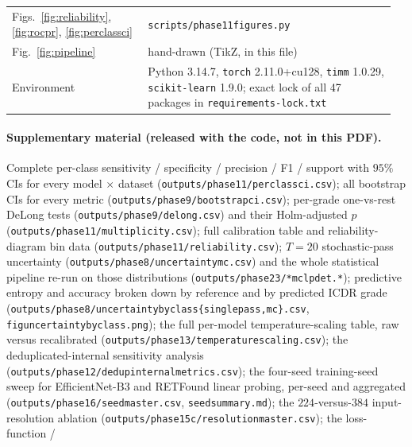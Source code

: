 \documentclass[journal]{IEEEtran}
\renewcommand{\_}{\origunderscore\allowbreak}
\begin{document}
\begin{table}[!t]
\begin{tabular}{@{}>{\raggedright\arraybackslash}p{0.34\linewidth} >{\raggedright\arraybackslash}p{0.62\linewidth}@{}}
Figs.~\ref{fig:reliability}, \ref{fig:rocpr}, \ref{fig:perclassci} & \texttt{scripts/\allowbreak{}phase11\_figures.py} \\
Fig.~\ref{fig:pipeline} & hand-drawn (TikZ, in this file) \\
Environment & Python 3.14.7, \texttt{torch} 2.11.0+cu128, \texttt{timm} 1.0.29, \texttt{scikit-learn} 1.9.0; exact lock of all 47 packages in \texttt{requirements-lock.txt} \\
\bottomrule
\end{tabular}
\end{table}


{\raggedright
\paragraph{Supplementary material (released with the code, not in this PDF).}
Complete per-class sensitivity / specificity / precision / F1 / support with
$95\%$ CIs for every model $\times$ dataset
(\texttt{outputs/\allowbreak{}phase11/\allowbreak{}per\_class\_ci.csv}); all bootstrap CIs for every metric
(\texttt{outputs/\allowbreak{}phase9/\allowbreak{}bootstrap\_ci.csv}); per-grade one-vs-rest DeLong tests
(\texttt{outputs/\allowbreak{}phase9/\allowbreak{}delong.csv}) and their Holm-adjusted $p$
(\texttt{outputs/\allowbreak{}phase11/\allowbreak{}multiplicity.csv}); full calibration table and
reliability-diagram bin data (\texttt{outputs/\allowbreak{}phase11/\allowbreak{}reliability\_*.csv});
$T=20$ stochastic-pass uncertainty
(\texttt{outputs/\allowbreak{}phase8/\allowbreak{}uncertainty\_mc.csv}) and the whole statistical pipeline
re-run on those distributions (\texttt{outputs/\allowbreak{}phase23/\allowbreak{}*\_mc\_lpdet.*}); predictive
entropy and accuracy broken down by reference and by predicted ICDR grade
(\texttt{outputs/\allowbreak{}phase8/\allowbreak{}uncertainty\_by\_class\_\{singlepass,mc\}.csv},
\texttt{fig\_uncertainty\_byclass\_*.png}); the full per-model
temperature-scaling table, raw versus recalibrated
(\texttt{outputs/\allowbreak{}phase13/\allowbreak{}temperature\_scaling.csv}); the deduplicated-internal
sensitivity analysis (\texttt{outputs/\allowbreak{}phase12/\allowbreak{}dedup\_internal\_metrics.csv});
the four-seed training-seed sweep for EfficientNet-B3 and RETFound linear
probing, per-seed and aggregated (\texttt{outputs/\allowbreak{}phase16/\allowbreak{}seed\_master.csv},
\texttt{seed\_summary.md}); the $224$-versus-$384$ input-resolution ablation
(\texttt{outputs/\allowbreak{}phase15c/\allowbreak{}resolution\_master.csv}); the loss-function /
}
\end{document}
